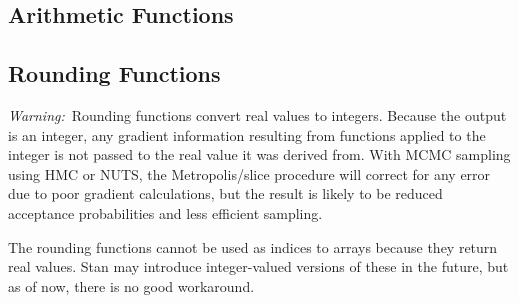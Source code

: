 \subsection{Arithmetic Functions}

%
\begin{description}
%
\end{description}


\subsection{Rounding Functions}

{\it Warning:}\ Rounding functions convert real values to integers.
Because the output is an integer, any gradient information resulting
from functions applied to the integer is not passed to the real value
it was derived from.  With MCMC sampling using HMC or NUTS, the
Metropolis/slice procedure will correct for any error due to poor
gradient calculations, but the result is likely to be reduced
acceptance probabilities and less efficient sampling.

The rounding functions cannot be used as indices to arrays because
they return real values.  Stan may introduce integer-valued versions
of these in the future, but as of now, there is no good workaround.

\begin{description}
%
%
%
%
%
\end{description}


